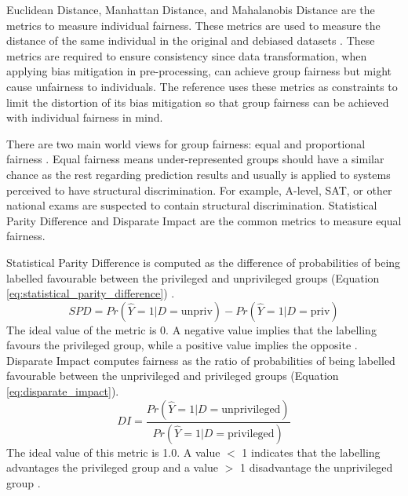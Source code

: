 \documentclass[sigconf,review]{acmart}
\begin{document}
	Euclidean Distance, Manhattan Distance, and Mahalanobis Distance are the metrics to measure individual fairness. These metrics are used to measure the distance of the same individual in the original and debiased datasets \cite{bellamy2018ai}. These metrics are required to ensure consistency since data transformation, when applying bias mitigation in pre-processing, can achieve group fairness but might cause unfairness to individuals. The reference \cite{calmon2017optimized} uses these metrics as constraints to limit the distortion of its bias mitigation so that group fairness can be achieved with individual fairness in mind. 
	
	There are two main world views for group fairness: equal and proportional fairness \cite{mahoney2020ai,ibmaif3602022guidance}. Equal fairness means under-represented groups should have a similar chance as the rest regarding prediction results and usually is applied to systems perceived to have structural discrimination. For example, A-level, SAT, or other national exams are suspected to contain structural discrimination. Statistical Parity Difference \cite{dwork2012fairness,mahoney2020ai,ibmaif3602022guidance} and Disparate Impact \cite{feldman2015disparate,mahoney2020ai,ibmaif3602022guidance} are the common metrics to measure equal fairness. 
	
	Statistical Parity Difference is computed as the difference of probabilities of being labelled favourable between the privileged and unprivileged groups (Equation \ref{eq:statistical_parity_difference}) \cite{dwork2012fairness,ibmaif3602022doc,bellamy2018ai}. 
	\begin{equation} \label{eq:statistical_parity_difference}
		SPD = Pr(\hat{Y} = 1 | D = \text{unpriv})
		- Pr(\hat{Y} = 1 | D = \text{priv})
	\end{equation}
	The ideal value of the metric is 0. A negative value implies that the labelling favours the privileged group, while a positive value implies the opposite \cite{ibmaif3602022doc,bellamy2018ai}. Disparate Impact \cite{feldman2015disparate,ibmaif3602022doc,bellamy2018ai} computes fairness as the ratio of probabilities of being labelled favourable between the unprivileged and privileged groups (Equation \ref{eq:disparate_impact}).
	\begin{equation} \label{eq:disparate_impact}
		DI = \frac{Pr(\hat{Y} = 1 | D = \text{unprivileged})}
		{Pr(\hat{Y} = 1 | D = \text{privileged})}
	\end{equation}
	The ideal value of this metric is 1.0. A value $<$ 1 indicates that the labelling advantages the privileged group and a value $>$ 1 disadvantage the unprivileged group \cite{ibmaif3602022doc,bellamy2018ai}.
	
\end{document}
